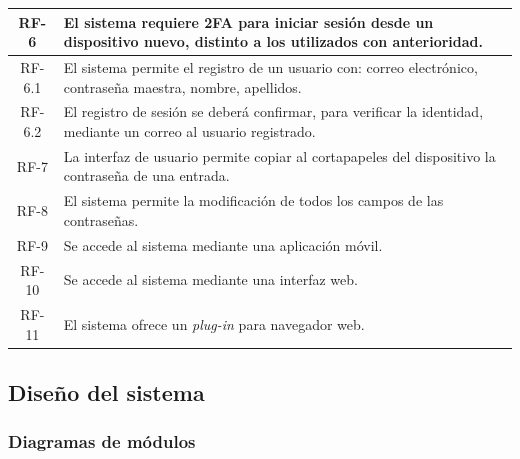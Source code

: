 \documentclass{article}
\begin{document}
\begin{table}[H]
\begin{tabular}{| c | p{30em} |}
        RF-6 & El sistema requiere 2FA para iniciar sesión desde un dispositivo nuevo, distinto a los utilizados con anterioridad. \\ \hline
        RF-6.1 & El sistema permite el registro de un usuario con: correo electrónico, contraseña maestra, nombre, apellidos.\\ \hline 
        RF-6.2 & El registro de sesión se deberá confirmar, para verificar la identidad, mediante un correo al usuario registrado. \\ \hline
        RF-7 & La interfaz de usuario permite copiar al cortapapeles del dispositivo la contraseña de una entrada. \\ \hline 
        RF-8 & El sistema permite la modificación de todos los campos de las contraseñas. \\ \hline
        RF-9 & Se accede al sistema mediante una aplicación móvil. \\ \hline
        RF-10 & Se accede al sistema mediante una interfaz web. \\ \hline
        RF-11 & El sistema ofrece un \textit{plug-in} para navegador web. \\ \hline
    \end{tabular}
\end{table}

\subsection{Diseño del sistema}



\subsubsection*{Diagramas de módulos}
\end{document}
